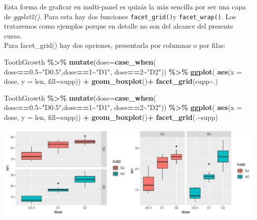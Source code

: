 \documentclass[
]{book}
\newenvironment{Shaded}{\begin{snugshade}}{\end{snugshade}}
\newcommand{\AttributeTok}[1]{\textcolor[rgb]{0.13,0.29,0.53}{#1}}
\newcommand{\DecValTok}[1]{\textcolor[rgb]{0.00,0.00,0.81}{#1}}
\newcommand{\FloatTok}[1]{\textcolor[rgb]{0.00,0.00,0.81}{#1}}
\newcommand{\FunctionTok}[1]{\textcolor[rgb]{0.13,0.29,0.53}{\textbf{#1}}}
\newcommand{\NormalTok}[1]{#1}
\newcommand{\SpecialCharTok}[1]{\textcolor[rgb]{0.81,0.36,0.00}{\textbf{#1}}}
\newcommand{\StringTok}[1]{\textcolor[rgb]{0.31,0.60,0.02}{#1}}
\begin{document}
\hfill\break
Esta forma de graficar en multi-panel es quizás la más sencilla por ser una capa de \emph{ggplot2()}. Para esta hay dos funciones \texttt{facet\_grid()}y \texttt{facet\_wrap()}. Los trataremos como ejemplos porque en detalle no son del alcance del presente curso.\\

Para facet\_grid() hay dos opciones, presentarla por columnas o por filas:\\

\begin{Shaded}
\begin{Highlighting}[]
\NormalTok{ToothGrowth }\SpecialCharTok{\%\textgreater{}\%}  \FunctionTok{mutate}\NormalTok{(}\AttributeTok{dose=}\FunctionTok{case\_when}\NormalTok{(}
\NormalTok{  dose}\SpecialCharTok{==}\FloatTok{0.5}\SpecialCharTok{\textasciitilde{}}\StringTok{"D0.5"}\NormalTok{,dose}\SpecialCharTok{==}\DecValTok{1}\SpecialCharTok{\textasciitilde{}}\StringTok{"D1"}\NormalTok{, dose}\SpecialCharTok{==}\DecValTok{2}\SpecialCharTok{\textasciitilde{}}\StringTok{"D2"}\NormalTok{)) }\SpecialCharTok{\%\textgreater{}\%} \FunctionTok{ggplot}\NormalTok{(}
    \FunctionTok{aes}\NormalTok{(}\AttributeTok{x =}\NormalTok{ dose, }\AttributeTok{y =}\NormalTok{ len, }\AttributeTok{fill=}\NormalTok{supp)) }\SpecialCharTok{+}  \FunctionTok{geom\_boxplot}\NormalTok{()}\SpecialCharTok{+} 
  \FunctionTok{facet\_grid}\NormalTok{(supp}\SpecialCharTok{\textasciitilde{}}\NormalTok{.)}


\NormalTok{ToothGrowth }\SpecialCharTok{\%\textgreater{}\%}  \FunctionTok{mutate}\NormalTok{(}\AttributeTok{dose=}\FunctionTok{case\_when}\NormalTok{(}
\NormalTok{  dose}\SpecialCharTok{==}\FloatTok{0.5}\SpecialCharTok{\textasciitilde{}}\StringTok{"D0.5"}\NormalTok{,dose}\SpecialCharTok{==}\DecValTok{1}\SpecialCharTok{\textasciitilde{}}\StringTok{"D1"}\NormalTok{, dose}\SpecialCharTok{==}\DecValTok{2}\SpecialCharTok{\textasciitilde{}}\StringTok{"D2"}\NormalTok{)) }\SpecialCharTok{\%\textgreater{}\%} \FunctionTok{ggplot}\NormalTok{(}
    \FunctionTok{aes}\NormalTok{(}\AttributeTok{x =}\NormalTok{ dose, }\AttributeTok{y =}\NormalTok{ len, }\AttributeTok{fill=}\NormalTok{supp)) }\SpecialCharTok{+}  \FunctionTok{geom\_boxplot}\NormalTok{()}\SpecialCharTok{+} 
  \FunctionTok{facet\_grid}\NormalTok{(.}\SpecialCharTok{\textasciitilde{}}\NormalTok{supp)}
\end{Highlighting}
\end{Shaded}

\begin{center}\includegraphics{R_Manual_files/figure-latex/unnamed-chunk-221-1} \end{center}
\end{document}
